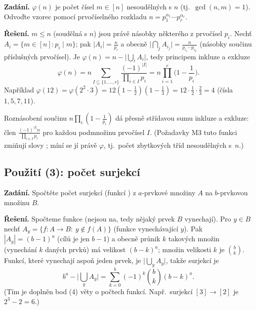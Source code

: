 \documentclass[11pt,a4paper]{article}
\begin{document}
\begin{priklad}
\textbf{Zadání.} $\varphi(n)$ je počet čísel $m\in[n]$ nesoudělných s $n$ (tj.\ $\gcd(n,m)=1$). Odvoďte vzorec pomocí prvočíselného rozkladu $n=p_1^{\alpha_1}\cdots p_r^{\alpha_r}$.

\textbf{Řešení.}  $m\le n$ (soudělná s $n$) jsou právě násobky některého z prvočísel $p_i$. Nechť $A_i=\{m\in[n]:p_i\mid m\}$; pak $|A_i|=\tfrac{n}{p_i}$ a obecně $\big|\bigcap_{j}A_{i_j}\big|=\tfrac{n}{p_{i_1}\cdots p_{i_k}}$ (násobky součinu příslušných prvočísel). Je $\varphi(n)=n-\big|\bigcup_i A_i\big|$, tedy principem inkluze a exkluze
\[
\varphi(n)=n\sum_{I\subseteq\{1,\dots,r\}}\frac{(-1)^{|I|}}{\prod_{i\in I}p_i}
=n\prod_{i=1}^{r}\Big(1-\frac{1}{p_i}\Big).
\]
Například $\varphi(12)=\varphi(2^2\cdot3)=12(1-\tfrac12)(1-\tfrac13)=12\cdot\tfrac12\cdot\tfrac23=4$ (čísla $1,5,7,11$).
\end{priklad}

\begin{intuice}
Roznásobení součinu $n\prod_i(1-\frac1{p_i})$ dá přesně střídavou sumu inkluze a exkluze: člen $\frac{(-1)^{|I|}n}{\prod_{i\in I}p_i}$ pro každou podmnožinu prvočísel $I$. (Požadavky M3 tuto funkci zmiňují slovy ; míní se jí právě $\varphi$, tj.\ počet zbytkových tříd nesoudělných s~$n$.)
\end{intuice}

\subsection{Použití (3): počet surjekcí}

\begin{priklad}
\textbf{Zadání.} Spočtěte počet surjekcí (funkcí ) z $a$-prvkové množiny $A$ na $b$-prvkovou množinu $B$.

\textbf{Řešení.} Spočteme  funkce (nejsou na, tedy nějaký prvek $B$ vynechají). Pro $y\in B$ nechť $A_y=\{f\colon A\to B:\ y\notin f(A)\}$ (funkce vynechávající $y$). Pak $|A_y|=(b-1)^a$ (cílů je jen $b-1$) a obecně průnik $k$ takových množin (vynechání $k$ daných prvků) má velikost $(b-k)^a$; množin velikosti $k$ je $\binom{b}{k}$. Funkcí, které vynechají aspoň jeden prvek, je $\big|\bigcup_y A_y\big|$, takže surjekcí je
\[
b^a-\Big|\bigcup_{y}A_y\Big|=\sum_{k=0}^{b}(-1)^{k}\binom{b}{k}(b-k)^{a}.
\]
(Tím je doplněn bod (4) věty o počtech funkcí. Např.\ surjekcí $[3]\to[2]$ je $2^3-2=6$.)
\end{priklad}
\end{document}
